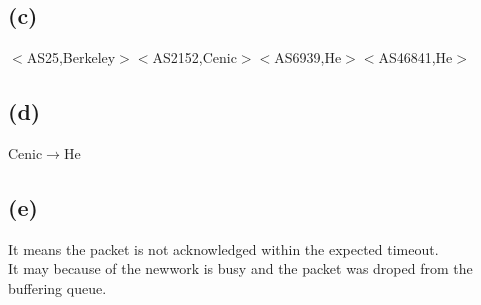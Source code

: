 \documentclass[11pt]{article}
\begin{document}
\subsection*{(c)}
$<$AS25,Berkeley$><$AS2152,Cenic$><$AS6939,He$><$AS46841,He$>$
\subsection*{(d)}
Cenic$\to$He
\subsection*{(e)}
It means the packet is not acknowledged within the expected timeout.\\
It may because of the newwork is busy and the packet was droped from the buffering queue.
\label{pg:end-of-p6}

%


\newpage










\end{document}

